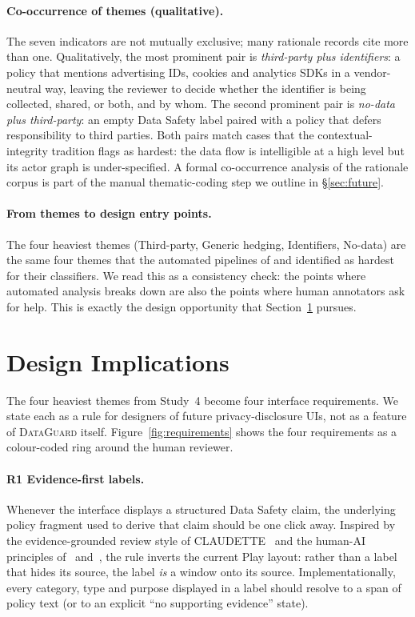 \documentclass[11pt,a4paper]{article}
\newcommand{\dataguard}{\textsc{DataGuard}}
\newcommand{\dgrule}[1]{\textsf{R#1}}
\begin{document}
\paragraph{Co-occurrence of themes (qualitative).}
The seven indicators are not mutually exclusive; many rationale
records cite more than one. Qualitatively, the most prominent pair is
\emph{third-party plus identifiers}: a policy that mentions advertising
IDs, cookies and analytics SDKs in a vendor-neutral way, leaving the
reviewer to decide whether the identifier is being collected, shared,
or both, and by whom. The second prominent pair is \emph{no-data plus
third-party}: an empty Data Safety label paired with a policy that
defers responsibility to third parties. Both pairs match cases that
the contextual-integrity tradition flags as hardest: the data flow is
intelligible at a high level but its actor graph is under-specified.
A formal co-occurrence analysis of the rationale corpus is part of
the manual thematic-coding step we outline in \S\ref{sec:future}.

\paragraph{From themes to design entry points.}
The four heaviest themes (Third-party, Generic hedging, Identifiers,
No-data) are the same four themes that the automated pipelines of
\citet{andow2019policylint} and \citet{andow2020policheck} identified
as hardest for their classifiers. We read this as a consistency
check: the points where automated analysis breaks down are also the
points where human annotators ask for help. This is exactly the
design opportunity that Section~\ref{sec:design} pursues.

\section{Design Implications}
\label{sec:design}
The four heaviest themes from Study~4 become four interface
requirements. We state each as a rule for designers of future
privacy-disclosure UIs, not as a feature of \dataguard{} itself.
Figure~\ref{fig:requirements} shows the four requirements as a
colour-coded ring around the human reviewer.

\paragraph{\dgrule{1} Evidence-first labels.}
Whenever the interface displays a structured Data Safety claim, the
underlying policy fragment used to derive that claim should be one
click away. Inspired by the evidence-grounded review style of
CLAUDETTE~\citep{lippi2019claudette} and the human-AI principles
of~\citet{amershi2019guidelines} and~\citet{cai2019hello}, the rule
inverts the current Play layout: rather than a label that hides its
source, the label \emph{is} a window onto its source.
Implementationally, every category, type and purpose displayed in a
label should resolve to a span of policy text (or to an explicit
``no supporting evidence'' state).
\end{document}

